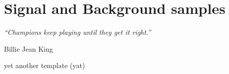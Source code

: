 \chapter{Signal and Background samples}
\label{ch:sig_bkg_samples}
\epigraph{\emph{“Champions keep playing until they get it right.”}}{Billie Jean King}

yet another template (yat)